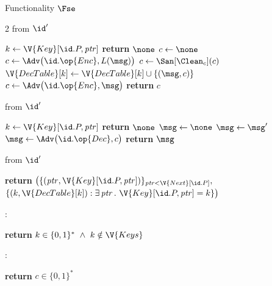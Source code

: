 \begin{interface}[nofloat]{Functionality $\Fse$ \\
}
{\begin{multicols}{2}
 \quad from $\id'$
\begin{algorithmic}[1]
\algcont
\State $k \gets \V{Key}[\id.P, \mathit{ptr}]$
  \State \textbf{return} $\none$
\EndIf
\State $c \gets \none$
  \State $c \gets \Adv\bigl(\id.\op{Enc}, L(\msg)\bigr)$
  \State $c \gets \San[\Clean_{c}](c)$
    \State $\V{DecTable}[k] \gets \V{DecTable}[k] \cup \{(\msg, c)\}$
  \EndIf
\EndIf
{}
  \State $c \gets \Adv\bigl(\id.\op{Enc}, \msg\bigr)$
\EndIf
\State \textbf{return} $c$
\algsave
\end{algorithmic}
\vspace{1.4ex}

 \quad from $\id'$
\begin{algorithmic}[1]
\algcont
\State $k \gets \V{Key}[\id.P, \mathit{ptr}]$
  \State \textbf{return} $\none$
\EndIf
\State $\msg \gets \none$
    \State $\msg \gets \msg'$
  \EndIf
\EndIf
{}
  \State $\msg \gets \Adv\bigl(\id.\op{Dec}, c\bigr)$
\EndIf
\State \textbf{return} $\msg$
\algsave
\end{algorithmic}
\vspace{1.4ex}

 \quad from $\id'$
\begin{algorithmic}[1]
\algcont
\State \textbf{return} $\bigl(\{(\mathit{ptr}, \V{Key}[\id.P, \mathit{ptr}])\}_{\mathit{ptr} < \V{Next}[\id.P]},$
\Statex \quad\ $\{(k, \V{DecTable}[k]) : \exists\, \mathit{ptr}\, .\ \V{Key}[\id.P,\mathit{ptr}] = k\}\bigr)$
\algsave
\end{algorithmic}
\vspace{1.4ex}

:
\begin{algorithmic}[1]
\algcont
\State \textbf{return} $k \in \{0,1\}^{*} \ \wedge\ k \notin \V{Keys}$
\algsave
\end{algorithmic}
\vspace{1.4ex}

:
\begin{algorithmic}[1]
\algcont
\State \textbf{return} $c \in \{0,1\}^{*}$
\algsave
\end{algorithmic}
\end{multicols}}
\end{interface}

